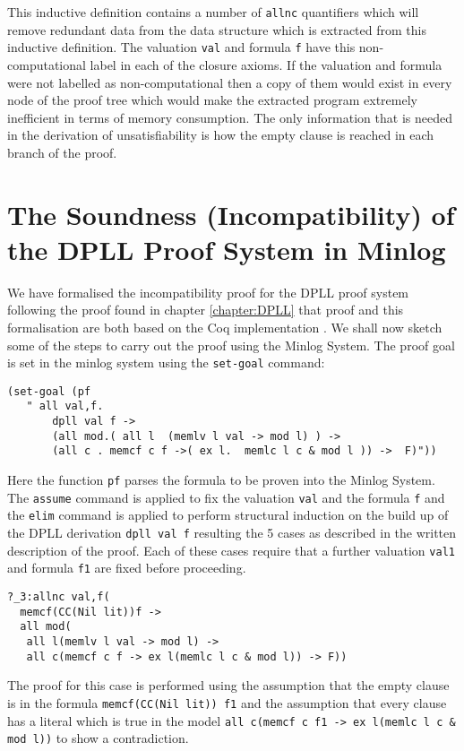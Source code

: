 This inductive definition contains a number of \texttt{allnc} quantifiers which will remove redundant data from the data structure which is extracted from this inductive definition. The valuation \texttt{val} and formula \texttt{f} have this non-computational label in each of the closure axioms. If the valuation and formula were not labelled as non-computational then a copy of them would exist in every node of the proof tree which would make the extracted program extremely inefficient in terms of memory consumption. The only information that is needed in the derivation of unsatisfiability is how the empty clause is reached in each branch of the proof.


\section{The Soundness (Incompatibility) of the DPLL Proof System in Minlog}
We have formalised the incompatibility proof for the DPLL proof system following the proof found in chapter \ref{chapter:DPLL} that proof and this formalisation are both based on the Coq implementation \cite{}. We shall now sketch some of the steps to carry out the proof using the Minlog System.
The proof goal is set in the minlog system using the \texttt{set-goal} command:

\begin{lstlisting}
(set-goal (pf 
   " all val,f.
       dpll val f ->  
       (all mod.( all l  (memlv l val -> mod l) ) -> 
       (all c . memcf c f ->( ex l.  memlc l c & mod l )) ->  F)"))
\end{lstlisting}

Here the function \texttt{pf} parses the formula to be proven into the Minlog System. The \texttt{assume} command is applied to fix the valuation \texttt{val} and the formula \texttt{f} and the \texttt{elim} command is applied to perform structural induction on the build up of the DPLL derivation \texttt{dpll val f} resulting the 5 cases as described in the written description of the proof. Each of these cases require that a further valuation \texttt{val1} and formula \texttt{f1} are fixed before proceeding.

\begin{lstlisting}[caption = "The Conflict Case in Minlog"]
?_3:allnc val,f(
  memcf(CC(Nil lit))f ->
  all mod(
   all l(memlv l val -> mod l) ->
   all c(memcf c f -> ex l(memlc l c & mod l)) -> F))
\end{lstlisting}

The proof for this case is performed using the assumption that the empty clause is in the formula \texttt{memcf(CC(Nil lit)) f1} and the assumption that every clause has a literal which is true in the model \texttt{all c(memcf c f1 -> ex l(memlc l c \& mod l))} to show a contradiction. 


